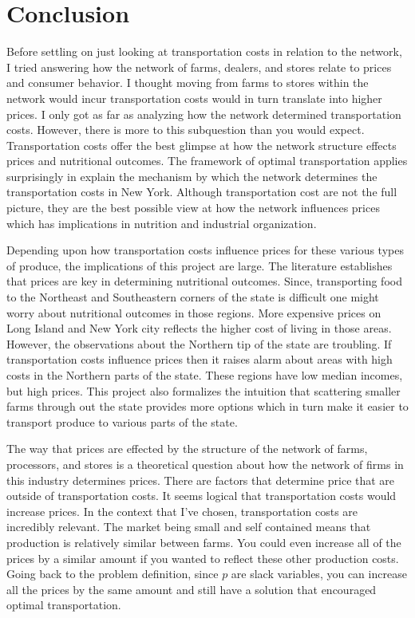 \documentclass{report}
\begin{document}
\section{Conclusion}
Before settling on just looking at transportation costs in relation to the network, I tried answering how the network of farms, dealers, and stores relate to prices and consumer behavior. I thought moving from farms to stores within the network would incur transportation costs would in turn translate into higher prices. I only got as far as analyzing how the network determined transportation costs. However, there is more to this subquestion than you would expect. Transportation costs offer the best glimpse at how the network structure effects prices and nutritional outcomes. The framework of optimal transportation applies surprisingly in explain the mechanism by which the network determines the transportation costs in New York. Although transportation cost are not the full picture, they are the best possible view at how the network influences prices which has implications in nutrition and industrial organization.

Depending upon how transportation costs influence prices for these various types of produce, the implications of this project are large. The literature establishes that prices are key in determining nutritional outcomes. Since, transporting food to the Northeast and Southeastern corners of the state is difficult one might worry about nutritional outcomes in those regions. More expensive prices on Long Island and New York city reflects the higher cost of living in those areas. However, the observations about the Northern tip of the state are troubling. If transportation costs influence prices then it raises alarm about areas with high costs in the Northern parts of the state. These regions have low median incomes, but high prices. This project also formalizes the intuition that scattering smaller farms through out the state provides more options which in turn make it easier to transport produce to various parts of the state.

The way that prices are effected by the structure of the network of farms, processors, and stores is a theoretical question about how the network of firms in this industry determines prices. There are factors that determine price that are outside of transportation costs. It seems logical that transportation costs would increase prices. In the context that I've chosen, transportation costs are incredibly relevant. The market being small and self contained means that production is relatively similar between farms. You could even increase all of the prices by a similar amount if you wanted to reflect these other production costs. Going back to the problem definition, since $p$ are slack variables, you can  increase all the prices by the same amount and still have a solution that encouraged optimal transportation.
\end{document}
